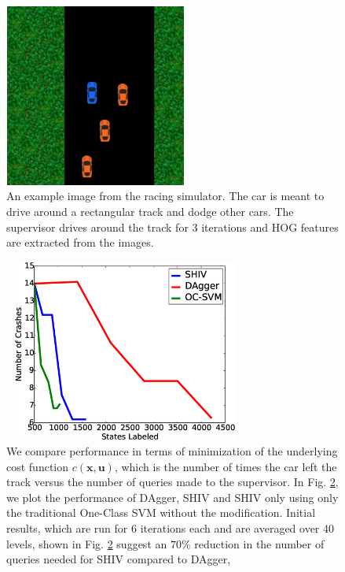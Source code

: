 \documentclass[10pt, conference]{ieeeconf}      %
\newcommand{\bu}{\mathbf{u}}
\newcommand{\bx}{\mathbf{x}}
\begin{document}
\begin{figure}[t!]
\centering
\includegraphics[width=6cm, height=6cm]{figures/race_car_track_example.png}
\caption{ An example image from the racing simulator. The car is meant to drive around a rectangular track and dodge other cars. The supervisor drives around the track for 3 iterations and HOG features are extracted from the images.}

\vspace*{-10pt}
\label{fig:race_car}
\end{figure}


\begin{figure}[t!]
\centering
\includegraphics[width=8cm, height=6cm]{figures/dagger_shiv_one_class.eps}
\caption{We compare performance in terms of minimization of the underlying cost function $c(\bx,\bu)$, which is the  number of times the car left the track versus the number of queries made to the supervisor. In Fig. \ref{fig:car_cost}, we plot the performance of DAgger, SHIV and SHIV only using only the traditional One-Class SVM without the modification.  Initial results, which are run for 6 iterations each and are averaged over 40 levels, shown in Fig. \ref{fig:car_cost} suggest an $70\%$ reduction in the number of queries needed for SHIV compared to DAgger,}
\vspace*{-10pt}
\label{fig:car_cost}
\end{figure}
\end{document}
